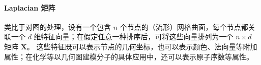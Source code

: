 %

 





\paragraph{Laplacian 矩阵}
%
类比于对图的处理，设有一个包含 $n$ 个节点的（流形）网格曲面，每个节点都关联一个 $d$ 维特征向量；在假定任意一种排序后，可将这些向量排列为一个 $n\times d$ 矩阵 $\mathbf{X}$。
%
这些特征既可以表示节点的几何坐标，也可以表示颜色、法向量等附加属性；在化学等以几何图建模分子的具体应用中，还可以表示原子序数等属性。


